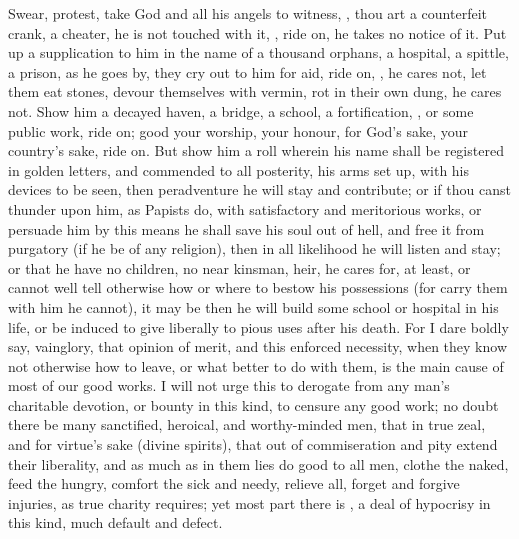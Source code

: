 {Swear, protest, take God and all his angels to witness, , thou art a counterfeit crank, a cheater, he is not touched
with it, , ride on, he takes no notice of it. Put up
a supplication to him in the name of a thousand orphans, a hospital, a
spittle, a prison, as he goes by, they cry out to him for aid, ride on,
, he cares not, let them eat stones, devour themselves with
vermin, rot in their own dung, he cares not. Show him a decayed haven,
a bridge, a school, a fortification, \etc{}, or some public work, ride
on; good your worship, your honour, for God's sake, your country's
sake, ride on. But show him a roll wherein his name shall be registered
in golden letters, and commended to all posterity, his arms set up,
with his devices to be seen, then peradventure he will stay and
contribute; or if thou canst thunder upon him, as Papists do, with
satisfactory and meritorious works, or persuade him by this means he
shall save his soul out of hell, and free it from purgatory (if he be
of any religion), then in all likelihood he will listen and stay; or
that he have no children, no near kinsman, heir, he cares for, at
least, or cannot well tell otherwise how or where to bestow his
possessions (for carry them with him he cannot), it may be then he will
build some school or hospital in his life, or be induced to give
liberally to pious uses after his death. For I dare boldly say,
vainglory, that opinion of merit, and this enforced necessity, when
they know not otherwise how to leave, or what better to do with them,
is the main cause of most of our good works. I will not urge this to
derogate from any man's charitable devotion, or bounty in this kind, to
censure any good work; no doubt there be many sanctified, heroical, and
worthy-minded men, that in true zeal, and for virtue's sake (divine
spirits), that out of commiseration and pity extend their liberality,
and as much as in them lies do good to all men, clothe the naked, feed
the hungry, comfort the sick and needy, relieve all, forget and forgive
injuries, as true charity requires; yet most part there is , a deal of hypocrisy in this kind, much default and defect.

}
